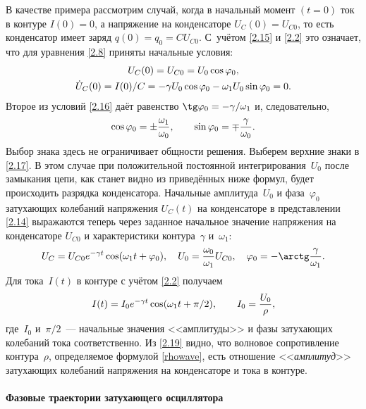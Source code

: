 В качестве примера 
рассмотрим случай, когда в начальный момент $(t=0)$ ток в
контуре $I(0)=0$, а напряжение на конденсаторе $U_C(0)=U_{C0}$, то есть
конденсатор имеет заряд $q(0)=q_0=CU_{C0}$. С~учётом \eqref{2.15} и \eqref{2.2}
это означает, что для уравнения \eqref{2.8} приняты начальные условия:
\begin{equation}
	\eqmark{2.16}
		\begin{gathered}[c]
			U_C(0)=U_{C0}=U_0 \cos\varphi_0, \\
			\dot{U}_C(0)=I(0)/C=-\gamma
U_0 \cos\varphi_0-\omega_1U_0 \sin\varphi_0=0.
		\end{gathered}
\end{equation}
Второе из условий \eqref{2.16} даёт равенство $\tg\varphi_0=-\gamma/\omega_1$
и, следовательно,
\begin{equation}\eqmark{2.17}
\cos\varphi_0=\pm\frac{\omega_1}{\omega_0}, \qquad 
\sin\varphi_0=\mp\frac{\gamma}{\omega_0}.
\end{equation}
Выбор знака здесь не ограничивает общности решения. Выберем верхние знаки в
\eqref{2.17}. В этом случае при положительной постоянной интегрирования~$U_0$
после замыкания цепи, как станет видно из приведённых ниже формул, будет
происходить разрядка конденсатора. Начальные амплитуда~$U_0$ и фаза~$\varphi_0$
затухающих колебаний напряжения $U_C(t)$ на конденсаторе в представлении
\eqref{2.14} выражаются теперь через заданное начальное значение напряжения на
конденсаторе $U_{C0}$ и характеристики контура~$\gamma$ и~$\omega_1$:
\begin{equation}\eqmark{2.18}
U_C=U_{C0} e^{-\gamma t}\cos(\omega_1t+\varphi_0), \quad
U_0 =\frac{\omega_0}{\omega_1}U_{C0}, \quad 
\varphi_0=-\arctg \frac{\gamma}{\omega_1}.
\end{equation}
Для тока~$I(t)$ в контуре с учётом \eqref{2.2} получаем 
\begin{equation}\eqmark{2.19}
I(t)=I_0 e^{-\gamma t}\cos(\omega_1t+\pi/2), \qquad I_0=\frac{U_0}{\rho},
\end{equation}
где~$I_0$ и~$\pi/2$~--- начальные значения <<амплитуды>> и фазы
затухающих колебаний тока соответственно.
Из \eqref{2.19} видно, что волновое сопротивление контура~$\rho$, 
определяемое формулой \eqref{rhowave},
есть отношение <<\emph{амплитуд}>> затухающих колебаний напряжения на конденсаторе и тока
 в контуре.

\paragraph{Фазовые траектории затухающего осциллятора}

